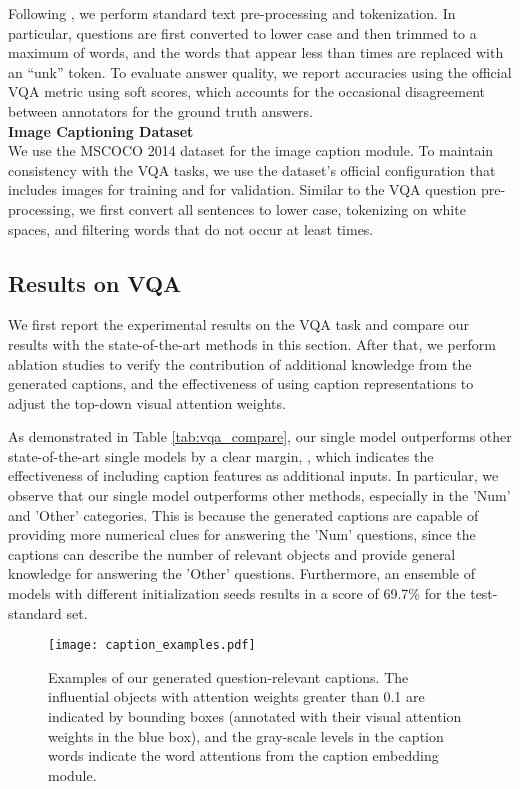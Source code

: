 \documentclass[11pt,a4paper]{article}
\begin{document}
Following , we perform standard text pre-processing and tokenization. In particular, questions are first converted to lower case and then trimmed to a maximum of  words, and the words that appear less than  times are replaced with an ``unk'' token. To evaluate answer quality, we report accuracies using the official VQA metric using soft scores, which accounts for the occasional disagreement between annotators for the ground truth answers.\\

\noindent\textbf{Image Captioning Dataset}\\
We use the MSCOCO 2014 dataset \cite{chen2015microsoft} for the image caption module. To maintain consistency with the VQA tasks, we use the dataset's official configuration that includes  images for training and  for validation. 
Similar to the VQA question pre-processing, we first convert all sentences to lower case, tokenizing on white spaces, and filtering words that do not occur at least  times. 

\subsection{Results on VQA}
We first report the experimental results on the VQA task and compare our results with the state-of-the-art methods in this section. After that, we perform ablation studies to verify the contribution of additional knowledge from the generated captions, and the effectiveness of using caption representations to adjust the top-down visual attention weights. 

As demonstrated in Table \ref{tab:vqa_compare}, our single model outperforms other state-of-the-art single models by a clear margin, , which indicates the effectiveness of including caption features as additional inputs. In particular, we observe that our single model outperforms other methods, especially in the 'Num' and 'Other' categories. This is because the generated captions are capable of providing more numerical clues for answering the 'Num' questions, since the captions can describe the number of relevant objects and provide general knowledge for answering the 'Other' questions. Furthermore, an ensemble of  models with different initialization seeds results in a score of 69.7\% for the test-standard set.
\begin{figure*}[!t]
\centering
\texttt{[image: caption\_examples.pdf]}
\caption{Examples of our generated question-relevant captions. The influential objects with attention weights greater than 0.1 are indicated by bounding boxes (annotated with their visual attention weights in the blue box), and the gray-scale levels in the caption words indicate the word attentions from the caption embedding module.}
\label{fig:attention_analysis}
\end{figure*}
\end{document}
